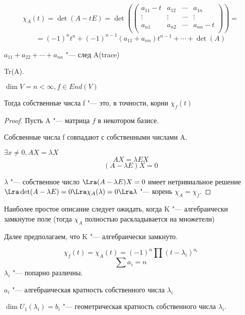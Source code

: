 $$\chi_A(t) = \det(A - tE) = \det(\begin{pmatrix}
a_{11} - t& a_{12}& \cdots & a_{1n}\\
\vdots& \vdots&\cdots&\vdots\\
a_{n1}& a_{n2} &\cdots&a_{nn} - t\\
\end{pmatrix}) = $$
$$= (-1)^{n}t^{n} + (-1)^{n - 1}(a_{11} + a_{nn})t^{n - 1} + \cdots + \det(A)$$

$a_{11} + a_{22} + \cdots + a_{nn}$ "--- след A(trace)

Tr(A).

\begin{theorem}{}
$\dim V = n < \infty, f \in End(V)$

Тогда собственные числа f "--- это, в точности, корни $\chi_{f}(t)$
\end{theorem}

\begin{proof}
Пусть A "--- матрица $f$ в некотором базисе.

Собсвенные числа f совпадают с собственными числами A.

$\exists x \ne 0, AX = \lambda X$
$$AX = \lambda E X $$
$$(A - \lambda E)X = 0$$

$\lambda$ "--- собственное число $\Lra (A - \lambda E)X = 0$  имеет нетривиальное
решение $\Lra \det(A - \lambda E) = 0 \Lra \chi_A(\lambda) = 0 \Lra \lambda$ "--- корень
$\chi_A = \chi_f$. 
\end{proof}

Наиболее простое описание следует ожидать, 
когда K "--- алгебраически замкнутое поле
(тогда $\chi_A$ полностью раскладывается на множетели)

Далее предполагаем, что K "--- алгебраически замкнуто.

$$\chi_f(t) = \chi_A(t) = (-1)^{n}\prod(t - \lambda_i)^{a_i}$$ 
$$ \sum a_i = n$$
$\lambda_i$ "--- попарно различны.

$a_i$  "--- алгебраическая кратность собственного числа $\lambda_i$

$\dim U_1(\lambda_i) = b_i$ "--- геометрическая кратность собственного числа $\lambda_i$.

